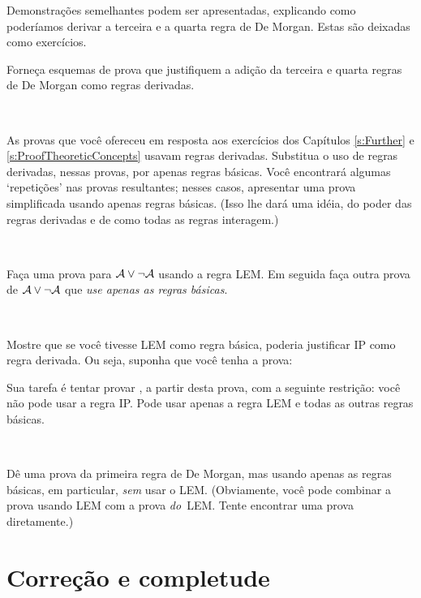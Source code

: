Demonstrações semelhantes podem ser apresentadas, explicando como poderíamos derivar a terceira e a quarta regra de De Morgan. Estas são deixadas como exercícios.

\practiceproblems

\problempart
Forneça esquemas de prova que justifiquem a adição da terceira e quarta regras de De Morgan como regras derivadas.

\

\problempart
As provas que você ofereceu em resposta aos exercícios dos Capítulos  \ref{s:Further} e \ref{s:ProofTheoreticConcepts} usavam regras derivadas. Substitua o uso de regras derivadas, nessas provas, por apenas regras básicas. Você encontrará algumas `repetições' nas provas resultantes; nesses casos, apresentar uma prova simplificada usando apenas regras básicas. (Isso lhe dará uma idéia, do poder das regras derivadas e de como todas as regras interagem.)

\

\problempart
Faça uma prova para $\mathcal{A} \vee \neg\mathcal{A}$ usando a regra LEM. Em seguida faça outra prova de $\mathcal{A} \vee \neg\mathcal{A}$ que \emph{use apenas as regras básicas}.
 
\

\problempart
Mostre que se você tivesse LEM como regra básica, poderia justificar IP como regra derivada. Ou seja, suponha que você tenha a prova:
\begin{fitchproof}
  \open
  \close
\end{fitchproof}
Sua tarefa é tentar provar , a partir desta prova, com a seguinte restrição: você não pode usar a regra IP. Pode usar apenas a regra LEM e todas as outras regras básicas.

\

\problempart
Dê uma prova da primeira regra de De Morgan, mas usando apenas as regras básicas, em particular,  \emph{sem} usar o LEM. (Obviamente, você pode combinar a prova usando LEM com a prova  \emph{do}~LEM. Tente encontrar uma prova diretamente.)


 

\chapter{Correção e completude}
\label{sec:soundness_and_completeness}


